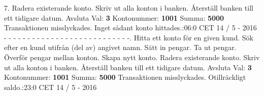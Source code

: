 \begin{multicols}{2}
7.   Radera existerande konto.   Skriv ut alla konton i banken.   Återställ banken till ett tidigare datum. Avsluta\newline
Val: \textbf{3}\newline
Kontonummer: \textbf{1001}\newline
Summa: \textbf{5000}\newline
Transaktionen misslyckades. Inget sådant konto hittades.:06:0 CET 14 / 5 - 2016\newline
- - - - - - - - - - - - - - - - - - - - - - - - - - -.   Hitta ett konto för en given kund.   Sök efter en kund utifrån (del av) angivet namn.   Sätt in pengar.   Ta ut pengar.   Överför pengar mellan konton.   Skapa nytt konto.   Radera existerande konto.   Skriv ut alla konton i banken.   Återställ banken till ett tidigare datum. Avsluta\newline
Val: \textbf{3}\newline
Kontonummer: \textbf{1001}\newline
Summa: \textbf{5000}\newline
Transaktionen misslyckades.  Otillräckligt saldo.:23:0 CET 14 / 5 - 2016\newline
\end{multicols}
